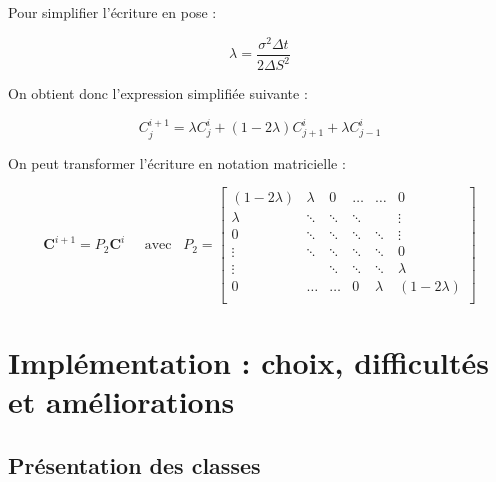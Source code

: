 \documentclass[11pt,a4paper]{article}
\begin{document}
\vspace{0.5cm}

Pour simplifier l'écriture en pose :

\vspace{0.5cm}

\begin{equation}
\lambda = \frac{\sigma^2 \Delta t}{2 \Delta S^{2}}
\end{equation}

\vspace{0.5cm}

On obtient donc l'expression simplifiée suivante :

\vspace{0.5cm}

$$  C_{j}^{i+1} = \lambda C_{j}^{i} + (1 - 2 \lambda) C_{j+1}^{i} + \lambda C_{j-1}^{i} $$

\vspace{0.5cm}

On peut transformer l'écriture en notation matricielle :

\vspace{0.5cm}

$$  \textbf{C}^{i+1} = P_{2}\textbf{C}^{i} \;\;\;\;\; \textrm{avec} \;\;\; P_{2} = \begin{bmatrix}
(1 - 2 \lambda) & \lambda & 0 & \dots & \dots & 0\\
\lambda & \ddots & \ddots & \ddots &  & \vdots\\
0 & \ddots & \ddots & \ddots & \ddots & \vdots\\
\vdots & \ddots & \ddots & \ddots & \ddots & 0\\
\vdots &  & \ddots & \ddots & \ddots & \lambda\\
0 & \dots & \dots & 0 & \lambda & (1 - 2 \lambda)\\
\end{bmatrix}$$

\newpage

\section{Implémentation : choix, difficultés et améliorations}

\vspace{0.5cm}

\subsection{Présentation des classes}
\end{document}
